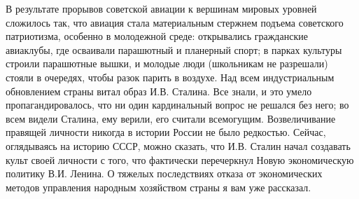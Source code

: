 \label{177-1}
В результате прорывов советской авиации к вершинам мировых уровней сложилось так, что авиация стала материальным стержнем подъема советского патриотизма, особенно в молодежной среде: открывались гражданские авиаклубы, где осваивали парашютный и планерный спорт; в парках культуры строили парашютные вышки, и молодые люди (школьникам не разрешали) стояли в очередях, чтобы разок парить в воздухе. Над всем индустриальным обновлением страны витал образ И.В. Сталина. Все знали, и это умело пропагандировалось, что ни один кардинальный вопрос не решался без него; во всем видели Сталина, ему верили, его считали всемогущим. Возвеличивание правящей личности никогда в истории России не было редкостью. Сейчас, оглядываясь на историю СССР, можно сказать, что И.В. Сталин начал создавать культ своей личности с того, что фактически перечеркнул Новую экономическую политику В.И. Ленина. О тяжелых последствиях отказа от экономических методов управления народным хозяйством страны я вам уже рассказал.
